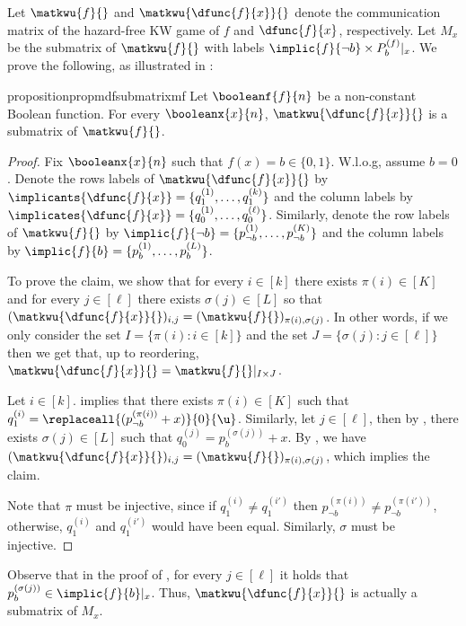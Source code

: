 \documentclass[acmsmall, nonacm, authorversion]{acmart}
\begin{document}
Let $\matkwu{f}{}$ and $\matkwu{\dfunc{f}{x}}{}$ denote the communication matrix of the hazard-free KW game of $f$ and $\dfunc{f}{x}$, respectively. Let $M_x$ be the submatrix of $\matkwu{f}{}$ with labels $\implic{f}{\neg b} \times P_b^{(f)}|_x$. We prove the following, as illustrated in :
\begin{restatable}{proposition}{propmdfsubmatrixmf}\label{prop:mdf-submatrix-mf}
Let $\booleanf{f}{n}$ be a non-constant Boolean function. For every $\booleanx{x}{n}$, $\matkwu{\dfunc{f}{x}}{}$ is a submatrix of $\matkwu{f}{}$.
\end{restatable}
\begin{proof}
Fix $\booleanx{x}{n}$ such that $f(x)=b \in \{0,1\}$. W.l.o.g, assume $b=0$. Denote the rows labels of $\matkwu{\dfunc{f}{x}}{}$ by $\implicants{\dfunc{f}{x}}=\{q_{1}^{(1)}, \dots, q_{1}^{(k)}\}$ and the column labels by $\implicates{\dfunc{f}{x}}=\{q_{0}^{(1)}, \dots, q_{0}^{(\ell)}\}$. Similarly, denote the row labels of $\matkwu{f}{}$ by $\implic{f}{\neg b}=\{p_{\neg b}^{(1)}, \dots, p_{\neg b}^{(K)}\}$ and the column labels by $\implic{f}{b}=\{p_{b}^{(1)}, \dots, p_{b}^{(L)}\}$.

To prove the claim, we show that for every $i \in [k]$ there exists $\pi(i)\in [K]$ and for every $j\in [\ell]$ there exists $\sigma(j) \in [L]$ so that $(\matkwu{\dfunc{f}{x}}{})_{i,j}=(\matkwu{f}{})_{\pi(i), \sigma(j)}$. In other words, if we only consider the set $I=\{\pi(i):i\in [k]\}$ and the set $J=\{\sigma(j):j\in [\ell]\}$ then we get that, up to reordering,  $\matkwu{\dfunc{f}{x}}{}={\matkwu{f}{}}|_{I\times J}$.

Let $i \in [k]$.  implies that there exists $\pi(i)\in [K]$ such that $q_{1}^{(i)}=\replaceall{(p_{\neg b}^{(\pi(i))}+x)}{0}{\u}$. Similarly, let $j\in [\ell]$, then by , there exists $\sigma(j)\in [L]$ such that $q_{0}^{(j)}=p_{b}^{(\sigma(j))}+x$. By , we have
$(\matkwu{\dfunc{f}{x}}{})_{i,j}=(\matkwu{f}{})_{\pi(i), \sigma(j)}$, which implies the claim.

Note that $\pi$ must be injective, since if $q_1^{(i)}\neq q_1^{(i')}$ then $p_{\neg b}^{(\pi(i))}\neq p_{\neg b}^{(\pi(i'))}$, otherwise, $q_1^{(i)}$ and $q_1^{(i')}$ would have been equal. Similarly, $\sigma$ must be injective.
\end{proof}

\begin{remark}\label{rem:mdf-submatrix-mf}
Observe that in the proof of , for every $j\in[\ell]$ it holds that $p_{b}^{(\sigma(j))}\in \implic{f}{b}|_x$. Thus, $\matkwu{\dfunc{f}{x}}{}$ is actually a submatrix of $M_x$.
\end{remark}
\end{document}
